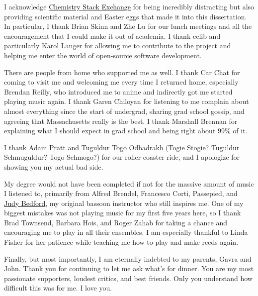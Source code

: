 \documentclass[%
  class = article,%
  crop = false,%
  float = true,%
  multi = true,%
  preview = false,%
]{standalone}
\begin{document}
I acknowledge \href{https://chemistry.stackexchange.com/users/194/}{\textcolor{black}{Chemistry Stack Exchange}} for being incredibly distracting but also providing scientific material and Easter eggs that made it into this dissertation. In particular, I thank Brian Skinn and Zhe Lu for our lunch meetings and all the encouragement that I could make it out of academia. I thank cclib and particularly Karol Langer for allowing me to contribute to the project and helping me enter the world of open-source software development.

There are people from home who supported me as well. I thank Car Chat for coming to visit me and welcoming me every time I returned home, especially Brendan Reilly, who introduced me to anime and indirectly got me started playing music again. I thank Garen Chiloyan for listening to me complain about almost everything since the start of undergrad, sharing grad school gossip, and agreeing that Massachusetts really is the best. I thank Marshall Brennan for explaining what I should expect in grad school and being right about 99\% of it.

I thank Adam Pratt and Tuguldur Togo Odbadrakh (Togie Stogie? Tuguldur Schmuguldur? Togo Schmogo?) for our roller coaster ride, and I apologize for showing you my actual bad side.

My degree would not have been completed if not for the massive amount of music I listened to, primarily from Alfred Brendel, Francesco Corti, Passepied, and \href{https://www.urbandictionary.com/define.php?term=%22Life%27s%20a%20Bitch%20and%20Then%20You%20Die%22}{\textcolor{black}{Judy Bedford}}, my original bassoon instructor who still inspires me. One of my biggest mistakes was not playing music for my first five years here, so I thank Brad Townsend, Barbara Hois, and Roger Zahab for taking a chance and encouraging me to play in all their ensembles. I am especially thankful to Linda Fisher for her patience while teaching me how to play and make reeds again.

Finally, but most importantly, I am eternally indebted to my parents, Gavra and John. Thank you for continuing to let me ask what's for dinner. You are my most passionate supporters, loudest critics, and best friends. Only you understand how difficult this was for me. I love you.
\end{document}

